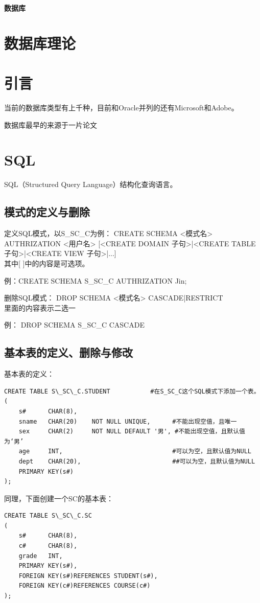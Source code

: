\documentclass[a4paper,12pt]{ctexart}
\begin{document}
\begin{center}
\huge \textbf{数据库}
\end{center}

\section{数据库理论}
\section{引言}
当前的数据库类型有上千种，目前和Oracle并列的还有Microsoft和Adobe。

数据库最早的来源于一片论文

\section{SQL}
SQL（Structured Query Language）结构化查询语言。
\subsection{模式的定义与删除}
定义SQL模式，以S\_SC\_C为例：
CREATE SCHEMA <模式名> AUTHRIZATION <用户名> [<CREATE DOMAIN 子句>|<CREATE TABLE 子句>|<CREATE VIEW 子句>|...]\\
其中[ ]中的内容是可选项。

例：CREATE SCHEMA S\_SC\_C AUTHRIZATION Jin;

删除SQL模式：
DROP SCHEMA <模式名> {CASCADE|RESTRICT}\\
{}里面的内容表示二选一

例： DROP SCHEMA S\_SC\_C CASCADE

\subsection{基本表的定义、删除与修改}
基本表的定义：

\begin{verbatim}
CREATE TABLE S\_SC\_C.STUDENT           #在S_SC_C这个SQL模式下添加一个表。
(
    s#      CHAR(8),
    sname   CHAR(20)    NOT NULL UNIQUE,      #不能出现空值，且唯一
    sex     CHAR(2)     NOT NULL DEFAULT '男', #不能出现空值，且默认值为‘男’
    age     INT,                              #可以为空，且默认值为NULL
    dept    CHAR(20),                         ##可以为空，且默认值为NULL
    PRIMARY KEY(s#)
);
\end{verbatim}
同理，下面创建一个SC的基本表：
\begin{verbatim}
CREATE TABLE S\_SC\_C.SC
(
    s#      CHAR(8),
    c#      CHAR(8),
    grade   INT,
    PRIMARY KEY(s#),
    FOREIGN KEY(s#)REFERENCES STUDENT(s#),
    FOREIGN KEY(c#)REFERENCES COURSE(c#)
);
\end{verbatim}
\end{document}
